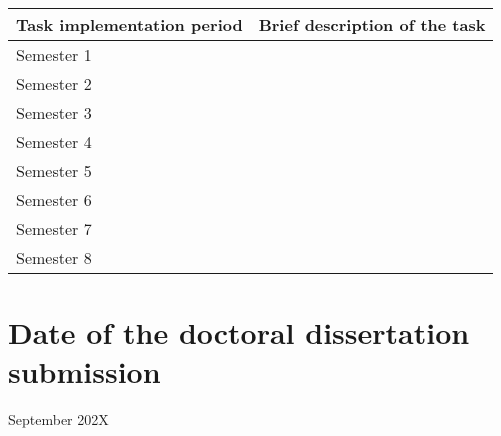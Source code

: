 
\begin{table}[ht]
    \centering
    \begin{tabular}{|p{1.1in}|p{4.5in}|}
    \hline
    \textbf{Task implementation period} & \multicolumn{1}{c|}{\textbf{Brief description of the task}} \\ \hline \hline
    Semester 1 &  \\ \hline
    Semester 2 &  \\ \hline
    Semester 3 &  \\ \hline
    Semester 4 &  \\ \hline
    Semester 5 &  \\ \hline
    Semester 6 &  \\ \hline
    Semester 7 &  \\ \hline
    Semester 8 &  \\ \hline
    \end{tabular}
\end{table}


\section{Date of the doctoral dissertation submission}


\begin{center}
    \large September 202X
\end{center}
